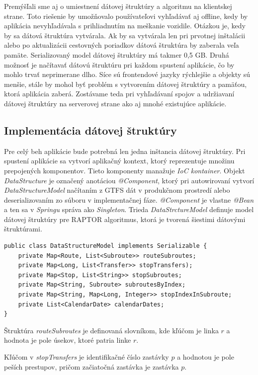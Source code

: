 Premýšľali sme aj o umiestnení dátovej štruktúry a algoritmu na klientskej strane. Toto riešenie by umožňovalo používateľovi vyhľadávať aj offline, kedy by aplikácia nevyhľadávala s prihliadnutím na meškanie vozidile. Otázkou je, kedy by sa dátová štruktúra vytvárala. Ak by sa vytvárala len pri prvotnej inštalácii alebo po aktualizácii cestovných poriadkov dátová štruktúra by zaberala veľa pamäte. Serializovaný model dátovej štruktúry má takmer 0,5 GB. Druhá možnosť je načítavať dátovú štruktúru pri každom spustení aplikácie, čo by mohlo trvať neprimerane dlho. Síce sú frontendové jazyky rýchlejšie a objekty sú menšie, stále by mohol byť problém s vytvorením dátovej štruktúry a pamäťou, ktorá aplikácia zaberá. Zostávame teda pri vyhľadávaní spojov a udržiavaní dátovej štruktúry na serverovej strane ako aj mnohé existujúce aplikácie.

\subsection{Implementácia dátovej štruktúry}
Pre celý beh aplikácie bude potrebná len jedna inštancia dátovej štruktúry. Pri spustení aplikácie sa vytvorí aplikačný kontext, ktorý reprezentuje množinu prepojených komponentov. Tieto komponenty manažuje \textit{IoC kontainer}. Objekt \textit{DataStructure} je označený anotáciou \textit{@Component}, ktorý pri autowirovaní vytvorí \textit{DataStructureModel} načítaním z GTFS dát v produkčnom prostredí alebo deserializovaním zo súboru v implementačnej fáze.\textit{ @Component }je vlastne \textit{@Bean} a ten sa v \textit{Springu} správa ako \textit{Singleton}. 
Trieda \textit{DataStrctureModel} definuje model dátovej štruktúry pre RAPTOR algoritmus, ktorá je tvorená šiestimi dátovými štruktúrami. 
\begin{lstlisting}
public class DataStructureModel implements Serializable {
    private Map<Route, List<Subroute>> routeSubroutes;
    private Map<Long, List<Transfer>> stopTransfers);
    private Map<Stop, List<String>> stopSubroutes;
    private Map<String, Subroute> subroutesByIndex;
    private Map<String, Map<Long, Integer>> stopIndexInSubroute;
    private List<CalendarDate> calendarDates;
}
\end{lstlisting}
Štruktúra \textit{routeSubroutes} je definovaná slovníkom, kde kľúčom je linka $r$ a hodnota je pole úsekov, ktoré patria linke $r$. 

Kľúčom v \textit{stopTransfers} je identifikačné číslo zastávky $p$ a hodnotou je pole peších prestupov, pričom začiatočná zastávka je zastávka $p$. 

